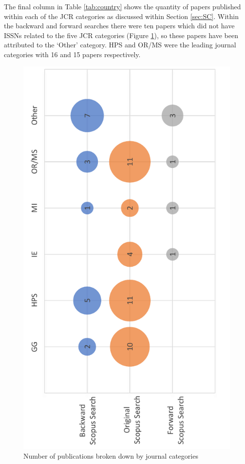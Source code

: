 \documentclass[../thesis.tex]{subfiles}
\begin{document}
The final column in Table \ref{tab:country} shows the quantity of papers published within each of the JCR categories as discussed within Section \ref{sec:SC}. Within the backward and forward searches there were ten papers which did not have ISSNs related to the five JCR categories (Figure \ref{fig:journalsearch1}), so these papers have been attributed to the `Other' category. HPS and OR/MS were the leading journal categories with 16 and 15 papers respectively.

\begin{figure}[H]
\centering
  \includegraphics[scale = 0.6,angle=270]{Chapter2/Figures/Journal search chapter1.pdf}
  \caption{Number of publications broken down by journal categories}

\label{fig:journalsearch1}  
\end{figure}
\end{document}
